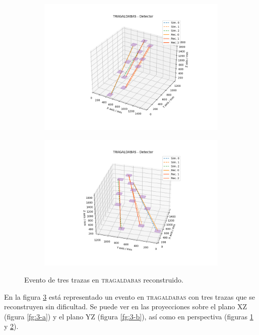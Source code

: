\documentclass[a4paper]{article}
\begin{document}
\begin{figure}[H]
  \begin{subfigure}[b]{0.5\linewidth}
    \centering
    \includegraphics[trim={3.5cm 1cm 2.5cm 1.9cm},clip,width=\linewidth]{tragaldabas_angle1.png} 
    \caption{} 
    \label{fg:3-c} 
  \end{subfigure}%
  \begin{subfigure}[b]{0.5\linewidth}
    \centering
    \includegraphics[trim={2.5cm 1cm 2.5cm 1.9cm},clip,width=\linewidth]{tragaldabas_angle2.png} 
    \caption{} 
    \label{fg:3-d} 
  \end{subfigure} 
  \caption{Evento de tres trazas en \textsc{tragaldabas} reconstruido.}
  \label{fg:3} 
\end{figure}

En la figura \ref{fg:3} está representado un evento en \textsc{tragaldabas} con tres trazas que se reconstruyen sin dificultad. Se puede ver en las proyecciones sobre el plano XZ (figura \ref{fg:3-a}) y el plano YZ (figura \ref{fg:3-b}), así como en perspectiva (figuras \ref{fg:3-c} y \ref{fg:3-d}). 
\end{document}
